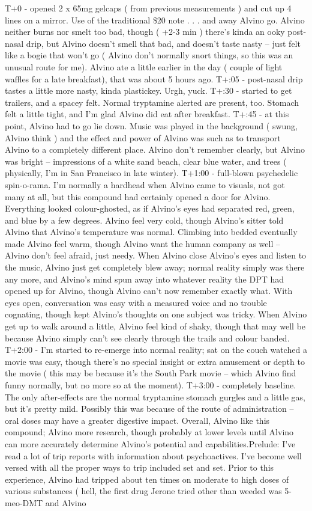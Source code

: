 \documentclass[12pt]{book}
\begin{document}
T+0 - opened 2 x 65mg gelcaps ( from previous measurements ) and cut up 4 lines on a mirror. Use of the traditional \$20 note  . . .  and away Alvino go. Alvino neither burns nor smelt too bad, though ( +2-3 min ) there's kinda an ooky post-nasal drip, but Alvino doesn't smell that bad, and doesn't taste nasty -- just felt like a bogie that won't go ( Alvino don't normally snort things, so this was an unusual route for me). Alvino ate a little earlier in the day ( couple of light waffles for a late breakfast), that was about 5 hours ago. T+:05 - post-nasal drip tastes a little more nasty, kinda plastickey. Urgh, yuck. T+:30 - started to get trailers, and a spacey felt. Normal tryptamine alerted are present, too. Stomach felt a little tight, and I'm glad Alvino did eat after breakfast. T+:45 - at this point, Alvino had to go lie down. Music was played in the background ( swung, Alvino think ) and the effect and power of Alvino was such as to transport Alvino to a completely different place. Alvino don't remember clearly, but Alvino was bright -- impressions of a white sand beach, clear blue water, and trees ( physically, I'm in San Francisco in late winter). T+1:00 - full-blown psychedelic spin-o-rama. I'm normally a hardhead when Alvino came to visuals, not got many at all, but this compound had certainly opened a door for Alvino. Everything looked colour-ghosted, as if Alvino's eyes had separated red, green, and blue by a few degrees. Alvino feel very cold, though Alvino's sitter told Alvino that Alvino's temperature was normal. Climbing into bedded eventually made Alvino feel warm, though Alvino want the human company as well -- Alvino don't feel afraid, just needy. When Alvino close Alvino's eyes and listen to the music, Alvino just get completely blew away; normal reality simply was there any more, and Alvino's mind spun away into whatever reality the DPT had opened up for Alvino, though Alvino can't now remember exactly what. With eyes open, conversation was easy with a measured voice and no trouble cognating, though kept Alvino's thoughts on one subject was tricky. When Alvino get up to walk around a little, Alvino feel kind of shaky, though that may well be because Alvino simply can't see clearly through the trails and colour banded. T+2:00 - I'm started to re-emerge into normal reality; sat on the couch watched a movie was easy, though there's no special insight or extra amusement or depth to the movie ( this may be because it's the South Park movie -- which Alvino find funny normally, but no more so at the moment). T+3:00 - completely baseline. The only after-effects are the normal tryptamine stomach gurgles and a little gas, but it's pretty mild. Possibly this was because of the route of administration -- oral doses may have a greater digestive impact. Overall, Alvino like this compound; Alvino  more research, though probably at lower levels until Alvino can more accurately determine Alvino's potential and capabilities.Prelude: I've read a lot of trip reports with information about psychoactives. I've become well versed with all the proper ways to trip included set and set. Prior to this experience, Alvino had tripped about ten times on moderate to high doses of various substances ( hell, the first drug Jerone tried other than weeded was 5-meo-DMT and Alvino 
\end{document}
